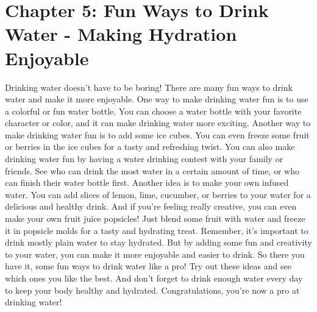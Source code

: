 \chapter{Chapter 5: Fun Ways to Drink Water - Making Hydration Enjoyable}

Drinking water doesn't have to be boring! There are
many fun ways to drink water and make it more enjoyable.
One way to make drinking water fun is to use a
colorful or fun water bottle. You can choose a water bottle with your favorite
character or color, and it can make drinking water more exciting.
Another way to make drinking water fun is to add some
ice cubes. You can even freeze some fruit or berries in the ice cubes for a
tasty and refreshing twist.
You can also make drinking water fun by having a water
drinking contest with your family or friends. See who can drink the most water
in a certain amount of time, or who can finish their water bottle first.
Another idea is to make your own infused water. You
can add slices of lemon, lime, cucumber, or berries to your water for a
delicious and healthy drink.
And if you're feeling really creative, you can even
make your own fruit juice popsicles! Just blend some fruit with water and
freeze it in popsicle molds for a tasty and hydrating treat.
Remember, it's important to drink mostly plain water
to stay hydrated. But by adding some fun and creativity to your water, you can
make it more enjoyable and easier to drink.
So there you have it, some fun ways to drink water
like a pro! Try out these ideas and see which ones you like the best. And don't
forget to drink enough water every day to keep your body healthy and hydrated.
Congratulations, you're now a pro at drinking water!
